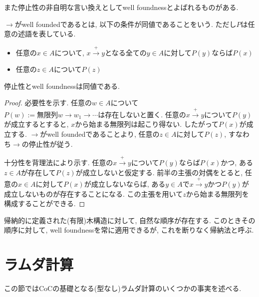 \documentclass{ltjsarticle}
\begin{document}
また停止性の非自明な言い換えとしてwell foundnessとよばれるものがある.

\begin{defn}
$\rightarrow$がwell foundedであるとは, 以下の条件が同値であることをいう. ただし$P$は任意の述語を表している.
 \begin{itemize}
  \item 任意の$x \in A$について, $x \xrightarrow{+} y$となる全ての$y \in A$に対して$P(y)$ならば$P(x)$
  \item 任意の$z \in A$について$P(z)$
 \end{itemize}
\end{defn}

\begin{thm}
 停止性とwell foundnessは同値である.
\end{thm}

\begin{proof}
 必要性を示す. 任意の$w \in A$について$P(w):= \text{無限列} w \rightarrow w_1 \rightarrow \cdots \text{は存在しない}$と置く. 任意の$x \xrightarrow{+} y$について$P(y)$が成立するとすると, $x$から始まる無限列は起こり得ない. したがって$P(x)$が成立する. $\rightarrow$がwell foundedであることより, 任意の$z \in A$に対して$P(z)$, すなわち$\rightarrow$の停止性が従う.
 
 十分性を背理法により示す. 任意の$x \xrightarrow{+} y$について$P(y)$ならば$P(x)$かつ, ある$z \in A$が存在して$P(z)$が成立しないと仮定する. 前半の主張の対偶をとると, 任意の$x \in A$に対して$P(x)$が成立しないならば, ある$y \in A$で$x \xrightarrow{+} y$かつ$P(y)$が成立しないものが存在することになる. この主張を用いて$z$から始まる無限列を構成することができる.
\end{proof}

\begin{rem}
帰納的に定義された(有限)木構造に対して, 自然な順序が存在する.
このときその順序に対して, well foundnessを常に適用できるが, これを断りなく帰納法と呼ぶ.
\end{rem}


\section{ラムダ計算}\label{lambda}
この節ではCoCの基礎となる(型なし)ラムダ計算のいくつかの事実を述べる.
\end{document}
